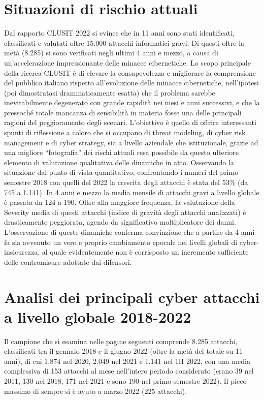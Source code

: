 \section{Situazioni di rischio attuali}
Dal rapporto CLUSIT 2022  si evince che in 11 anni sono stati identificati, classificati e valutati oltre 15.000 attacchi informatici gravi. Di questi oltre la metà (8.285) si sono verificati negli ultimi 4 anni e mezzo, a causa di un’accelerazione impressionante delle minacce cibernetiche.
Lo scopo principale della ricerca CLUSIT è di elevare la consapevolezza e migliorare la comprensione del pubblico italiano rispetto all’evoluzione delle minacce cibernetiche, nell’ipotesi (poi dimostratasi drammaticamente esatta) che il problema sarebbe inevitabilmente degenerato con grande rapidità nei mesi e anni successivi, e che la pressoché totale mancanza di sensibilità in materia fosse una delle principali ragioni del peggioramento degli scenari. L’obiettivo è quello di offrire interessanti spunti di riflessione a coloro che si occupano di threat modeling, di cyber risk management e di cyber strategy, sia a livello aziendale che istituzionale, grazie ad una migliore “fotografia” dei rischi attuali resa possibile da questo ulteriore elemento di valutazione qualitativa delle dinamiche in atto.
Osservando la situazione dal punto di vista quantitativo, confrontando i numeri del primo semestre 2018 con quelli del 2022 la crescita degli attacchi è stata del 53\% (da 745 a 1.141). In 4 anni e mezzo la media mensile di attacchi gravi a livello globale è passata da 124 a 190. Oltre alla maggiore frequenza, la valutazione della Severity media di questi attacchi (indice di gravità degli attacchi analizzati) è drasticamente peggiorata, agendo da significativo moltiplicatore dei danni. L’osservazione di queste dinamiche conferma convinzione che a partire da 4 anni fa sia avvenuto un vero e proprio cambiamento epocale nei livelli globali di cyber-insicurezza, al quale evidentemente non è corrisposto un incremento sufficiente delle contromisure adottate dai difensori.
\section [Analisi cyber attacchi a livello globale] {Analisi dei principali cyber attacchi a livello globale 2018-2022}
Il campione che si esamina nelle pagine seguenti comprende 8.285 attacchi, classificati tra il gennaio 2018 e il giugno 2022 (oltre la metà del totale su 11 anni), di cui 1.874 nel 2020, 2.049 nel 2021 e 1.141 nel 1H 2022, con una media complessiva di 153 attacchi al mese nell’intero periodo considerato (erano 39 nel 2011, 130 nel 2018, 171 nel 2021 e sono 190 nel primo semestre 2022). Il picco massimo di sempre si è avuto a marzo 2022 (225 attacchi). 


